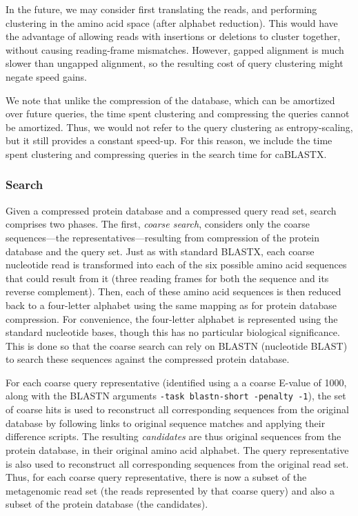 \documentclass[review,preprint,12pt]{elsarticle}
\theoremstyle{definition}
\theoremstyle{remark}
\begin{document}
In the future, we may consider first translating the reads, and performing
clustering in the amino acid space (after alphabet reduction).
This would have the advantage of allowing reads with insertions or deletions
to cluster together, without causing reading-frame mismatches.
However, gapped alignment is much slower than ungapped alignment,
so the resulting cost of query clustering might negate speed gains.

We note that unlike the compression of the database, which can be amortized 
over future queries, the time spent clustering and compressing the queries 
cannot be amortized.
Thus, we would not refer to the query clustering as entropy-scaling, but it
still provides a constant speed-up.
For this reason, we include the time spent clustering and compressing queries in the search time for caBLASTX.


\subsubsection{Search}

Given a compressed protein database and a compressed query read set, search
comprises two phases.
The first, \emph{coarse search}, considers only the coarse sequences---the
representatives---resulting from compression of the protein database and the
query set.
Just as with standard BLASTX, each coarse nucleotide read is transformed into 
each of the six possible amino acid sequences that could result from it (three 
reading frames for both the sequence and its reverse complement).
Then, each of these amino acid sequences is then reduced back to a four-letter
alphabet using the same mapping as for protein database compression.
For convenience, the four-letter alphabet is represented using the standard
nucleotide bases, though this has no particular biological significance.
This is done so that the coarse search can rely on BLASTN (nucleotide BLAST) to
search these sequences against the compressed protein database.

For each coarse query representative (identified using a a coarse E-value of 
1000, along with the BLASTN arguments \texttt{-task blastn-short -penalty -1}), 
the set of coarse hits is used to
reconstruct all corresponding sequences from the original database by following
links to original sequence matches and applying their difference scripts.
The resulting \emph{candidates} are thus original sequences from the protein
database, in their original amino acid alphabet.
The query representative is also used to reconstruct all corresponding sequences
from the original read set.
Thus, for each coarse query representative, there is now a subset of the
metagenomic read set (the reads represented by that coarse query) and also a
subset of the protein database (the candidates).
\end{document}
